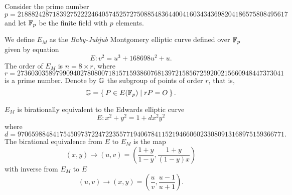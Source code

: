 Consider the prime number 
$$	p = 21888242871839275222246405745257275088548364
400416034343698204186575808495617 $$
and let $\mathbb{F}_p$ be the finite field with $p$ elements. 

%
We define $E_M$ as the {\it Baby-Jubjub} Montgomery elliptic curve defined over $\mathbb{F}_p$ given %
by equation
$$	E: v^2 = u^3 +  168698u^2 + u. $$
The order of $E_M$ is $n = 8\times r$, where 
$$	r = 2736030358979909402780800718157159386076813972
158567259200215660948447373041 $$ 
is a prime number. Denote by $\mathbb{G}$ the subgroup of points of order $r$, that is, %
$$\mathbb{G} = \Set{ P \in E(\ensuremath{\mathbb{F}_p}) | r P = O  }.$$

$E_M$ is birationally equivalent to the Edwards elliptic curve %
$$	E: x^2 + y^2 = 1 +  d x^2 y^2 $$
where
$ d = 9706598848417545097372247223557719406784115219466060233080913168975159366771.$ \\


The birational equivalence \cite[Thm. 3.2]{twisted} from $E$ to $E_M$ is the map
$$ (x,y) \to (u,v) = \left( \frac{1 + y}{1 - y} , \frac{1 + y}{(1 - y)x} \right) $$
with inverse from $E_M$ to $E$
$$ (u, v) \to (x, y) = \left(  \frac{u}{v}, \frac{u - 1}{u + 1}   \right). $$
